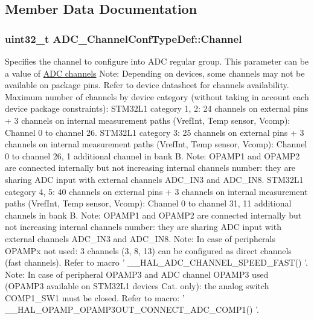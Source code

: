 \subsection{Member Data Documentation}
\hypertarget{struct_a_d_c___channel_conf_type_def_a771e64a3695f61cb1cce4fd65e956f6b}{
\subsubsection[{Channel}]{\setlength{\rightskip}{0pt plus 5cm}uint32\-\_\-t A\-D\-C\-\_\-\-Channel\-Conf\-Type\-Def\-::\-Channel}}\label{struct_a_d_c___channel_conf_type_def_a771e64a3695f61cb1cce4fd65e956f6b}
Specifies the channel to configure into A\-D\-C regular group. This parameter can be a value of \hyperlink{group___a_d_c__channels}{A\-D\-C channels} Note\-: Depending on devices, some channels may not be available on package pins. Refer to device datasheet for channels availability. Maximum number of channels by device category (without taking in account each device package constraints)\-: S\-T\-M32\-L1 category 1, 2\-: 24 channels on external pins + 3 channels on internal measurement paths (Vref\-Int, Temp sensor, Vcomp)\-: Channel 0 to channel 26. S\-T\-M32\-L1 category 3\-: 25 channels on external pins + 3 channels on internal measurement paths (Vref\-Int, Temp sensor, Vcomp)\-: Channel 0 to channel 26, 1 additional channel in bank B. Note\-: O\-P\-A\-M\-P1 and O\-P\-A\-M\-P2 are connected internally but not increasing internal channels number\-: they are sharing A\-D\-C input with external channels A\-D\-C\-\_\-\-I\-N3 and A\-D\-C\-\_\-\-I\-N8. S\-T\-M32\-L1 category 4, 5\-: 40 channels on external pins + 3 channels on internal measurement paths (Vref\-Int, Temp sensor, Vcomp)\-: Channel 0 to channel 31, 11 additional channels in bank B. Note\-: O\-P\-A\-M\-P1 and O\-P\-A\-M\-P2 are connected internally but not increasing internal channels number\-: they are sharing A\-D\-C input with external channels A\-D\-C\-\_\-\-I\-N3 and A\-D\-C\-\_\-\-I\-N8. Note\-: In case of peripherals O\-P\-A\-M\-Px not used\-: 3 channels (3, 8, 13) can be configured as direct channels (fast channels). Refer to macro ' \-\_\-\-\_\-\-H\-A\-L\-\_\-\-A\-D\-C\-\_\-\-C\-H\-A\-N\-N\-E\-L\-\_\-\-S\-P\-E\-E\-D\-\_\-\-F\-A\-S\-T() '. Note\-: In case of peripheral O\-P\-A\-M\-P3 and A\-D\-C channel O\-P\-A\-M\-P3 used (O\-P\-A\-M\-P3 available on S\-T\-M32\-L1 devices Cat. only)\-: the analog switch C\-O\-M\-P1\-\_\-\-S\-W1 must be closed. Refer to macro\-: ' \-\_\-\-\_\-\-H\-A\-L\-\_\-\-O\-P\-A\-M\-P\-\_\-\-O\-P\-A\-M\-P3\-O\-U\-T\-\_\-\-C\-O\-N\-N\-E\-C\-T\-\_\-\-A\-D\-C\-\_\-\-C\-O\-M\-P1() '. \hypertarget{struct_a_d_c___channel_conf_type_def_a106e52a928aefb7778802bac0b75cf2d}{
}
